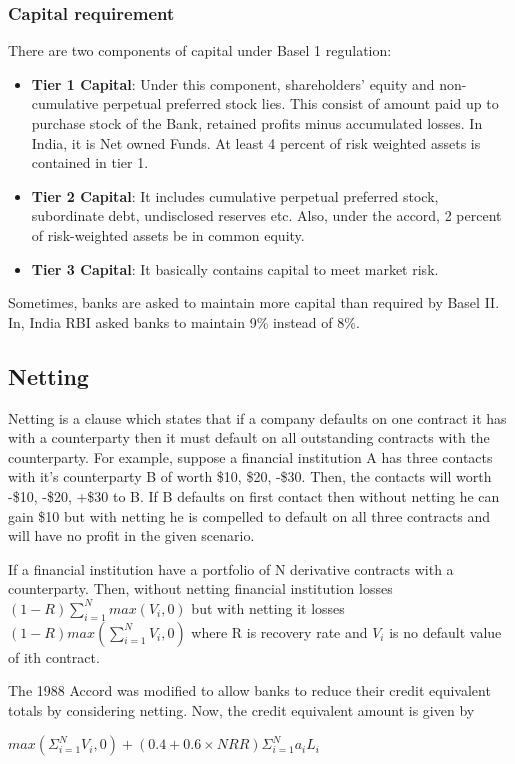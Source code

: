 \documentclass[11pt]{article}
\numberwithin{equation}{section}
\begin{document}
\subsubsection{Capital requirement}\medskip

There are two components of capital under Basel 1 regulation:
\begin{itemize}
\item\textbf {Tier 1 Capital}: Under this component, shareholders' equity and non-cumulative perpetual preferred stock lies. This consist of amount paid up to purchase stock of the Bank, retained profits minus accumulated losses. In India, it is Net owned Funds. At least 4 percent of risk weighted assets is contained in tier 1.
\item\textbf {Tier 2 Capital}: It includes cumulative perpetual preferred stock, subordinate debt, undisclosed reserves etc.
Also, under the accord, 2 percent of risk-weighted assets be in common equity.
\item \textbf{Tier 3 Capital}: It basically contains capital to meet market risk.
\end{itemize}
Sometimes, banks are asked to maintain more capital than required by Basel II. In, India RBI asked  banks to maintain 9\% instead of 8\%.

\subsection{Netting}
\medskip

Netting is a clause which states that if a company defaults on one contract it has with a counterparty then it must default on all outstanding contracts with the counterparty. For example, suppose a financial institution A has three contacts with it's counterparty B of worth \$10, \$20, -\$30. Then, the contacts will worth  -\$10, -\$20, +\$30 to B. If B defaults on first contact then without netting he can gain \$10 but with netting he is compelled to default on all three contracts and will have no profit in the given scenario.

  \hspace{1cm} If a financial institution have a portfolio of N derivative contracts with a counterparty. Then, without netting financial institution losses $(1-R)\sum_{i=1}^N max(V_i,0) $ but with netting it losses $(1-R) max(\sum_{i=1}^N V_i,0)$ where R is recovery rate and $V_i$ is no default value of ith contract.
  
  \hspace{1cm} The 1988 Accord was modified to allow banks to
reduce their credit equivalent totals by considering netting. Now, the credit equivalent amount is given by 
\begin{center}
$max \left(\Sigma_{i=1}^{N} V_i,0 \right) + (0.4+0.6\times NRR) \Sigma_{i=1}^{N} a_i L_i$
\end{center} 
 
\end{document}

